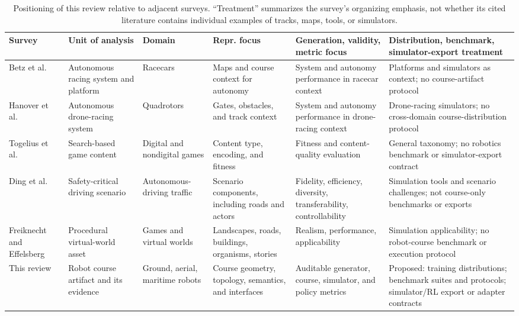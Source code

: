 \begin{table}[t]
  \centering
  \caption{Positioning of this review relative to adjacent surveys. ``Treatment''
  summarizes the survey's organizing emphasis, not whether its cited literature
  contains individual examples of tracks, maps, tools, or simulators.}
  \label{tab:adjacent-survey-positioning}
  \scriptsize
  \setlength{\tabcolsep}{3pt}
  \renewcommand{\arraystretch}{1.05}
  \begin{tabularx}{\textwidth}{@{}p{1.75cm}YYYYY@{}}
    \toprule
    Survey & Unit of analysis & Domain & Repr. focus & Generation, validity, metric focus & Distribution, benchmark, simulator-export treatment \\
    \midrule
    Betz et al.\ \cite{Betz2022AutonomousVehicles}
      & Autonomous racing system and platform
      & Racecars
      & Maps and course context for autonomy
      & System and autonomy performance in racecar context
      & Platforms and simulators as context; no course-artifact protocol \\
    Hanover et al.\ \cite{Hanover2023AutonomousDrone}
      & Autonomous drone-racing system
      & Quadrotors
      & Gates, obstacles, and track context
      & System and autonomy performance in drone-racing context
      & Drone-racing simulators; no cross-domain course-distribution protocol \\
    Togelius et al.\ \cite{Togelius2011SearchBased}
      & Search-based game content
      & Digital and nondigital games
      & Content type, encoding, and fitness
      & Fitness and content-quality evaluation
      & General taxonomy; no robotics benchmark or simulator-export contract \\
    Ding et al.\ \cite{Ding2023SafetyCritical}
      & Safety-critical driving scenario
      & Autonomous-driving traffic
      & Scenario components, including roads and actors
      & Fidelity, efficiency, diversity, transferability, controllability
      & Simulation tools and scenario challenges; not course-only benchmarks or exports \\
    Freiknecht and Effelsberg\ \cite{Freiknecht2017SurveyVirtualWorlds}
      & Procedural virtual-world asset
      & Games and virtual worlds
      & Landscapes, roads, buildings, organisms, stories
      & Realism, performance, applicability
      & Simulation applicability; no robot-course benchmark or execution protocol \\
    This review
      & Robot course artifact and its evidence
      & Ground, aerial, maritime robots
      & Course geometry, topology, semantics, and interfaces
      & Auditable generator, course, simulator, and policy metrics
      & Proposed: training distributions; benchmark suites and protocols; simulator/RL export or adapter contracts \\
    \bottomrule
  \end{tabularx}
\end{table}

